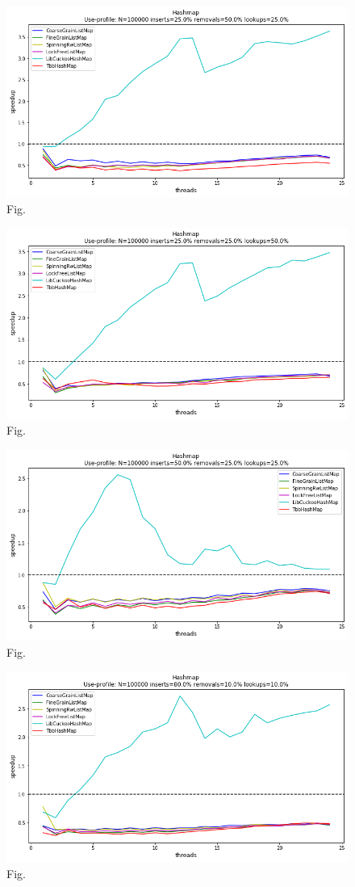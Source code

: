 \documentclass[11pt]{article}
\begin{document}
\begin{figure}[h]
\centering
\includegraphics[width=0.5\linewidth]{figs/lateday/combined/lateday_combined_map_insert_25_lookup_25_removal_50}
\caption{Fig.}
\label{fig:fig2}
\end{figure}

\begin{figure}[h]
\centering
\includegraphics[width=0.5\linewidth]{figs/lateday/combined/lateday_combined_map_insert_25_lookup_50_removal_25}
\caption{Fig.}
\label{fig:fig2}
\end{figure}

\begin{figure}[h]
\centering
\includegraphics[width=0.5\linewidth]{figs/lateday/combined/lateday_combined_map_insert_50_lookup_25_removal_25}
\caption{Fig.}
\label{fig:fig2}
\end{figure}

\begin{figure}[h]
\centering
\includegraphics[width=0.5\linewidth]{figs/lateday/combined/lateday_combined_map_insert_80_lookup_10_removal_10}
\caption{Fig.}
\label{fig:fig2}
\end{figure}
\end{document}
